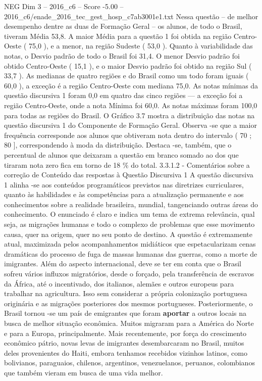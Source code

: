 \begin{textsample}{NEG Dim 3 – 2016\_c6 – Score -5.00 – 2016\_c6/enade\_2016\_tec\_gest\_hosp\_c7ab3001e1.txt}
Nessa questão – de melhor desempenho dentre as duas de Formação Geral – os alunos, de todo o Brasil, tiveram Média 53,8.
A maior Média para a questão 1 foi obtida na região Centro-Oeste ( 75,0 ), e a menor, na região Sudeste ( 53,0 ).
Quanto à variabilidade das notas, o Desvio padrão de todo o Brasil foi 31,4.
O menor Desvio padrão foi obtido Centro-Oeste ( 15,1 ), e o maior Desvio padrão foi obtido na região Sul ( 33,7 ).
As medianas de quatro regiões e do Brasil como um todo foram iguais ( 60,0 ), a exceção é a região Centro-Oeste com mediana 75,0.
As notas mínimas da questão discursiva 1 foram 0,0 em quatro das cinco regiões — a exceção foi a região Centro-Oeste, onde a nota Mínima foi 60,0.
As notas máximas foram 100,0 para todas as regiões do Brasil.
O Gráfico 3.7 mostra a distribuição das notas na questão discursiva 1 do Componente de Formação Geral.
Observa -se que a maior frequência corresponde aos alunos que obtiveram nota dentro do intervalo ( 70 ; 80 ], correspondendo à moda da distribuição.
Destaca -se, também, que o percentual de alunos que deixaram a questão em branco somado ao dos que tiraram nota zero fica em torno de 18 \% do total. 3.3.1.2 - Comentários sobre a correção de Conteúdo das respostas à Questão Discursiva 1 A questão discursiva 1 alinha -se aos conteúdos programáticos previstos nas diretrizes curriculares, quanto às habilidades e às competências para a atualização permanente e aos conhecimentos sobre a realidade brasileira, mundial, tangenciando outras áreas do conhecimento.
O enunciado é claro e indica um tema de extrema relevância, qual seja, as migrações humanas e todo o complexo de problemas que esse movimento causa, quer na origem, quer no seu ponto de destino.
A questão é extremamente atual, maximizada pelos acompanhamentos midiáticos que espetacularizam cenas dramáticas do processo de fuga de massas humanas das guerras, como a morte de imigrantes.
Além do aspecto internacional, deve se ter em conta que o Brasil sofreu vários influxos migratórios, desde o forçado, pela transferência de escravos da África, até o incentivado, dos italianos, alemães e outros europeus para trabalhar na agricultura.
Isso sem considerar a própria colonização portuguesa originária e as migrações posteriores dos mesmos portugueses.
Posteriormente, o Brasil tornou -se um país de emigrantes que foram \textbf{aportar} a outros locais na busca de melhor situação econômica.
Muitos migraram para a América do Norte e para a Europa, principalmente.
Mais recentemente, por força do crescimento econômico pátrio, novas levas de imigrantes desembarcaram no Brasil, muitos deles provenientes do Haiti, embora tenhamos recebidos vizinhos latinos, como bolivianos, paraguaios, chilenos, argentinos, venezuelanos, peruanos, colombianos que também vieram em busca de uma vida melhor.

\end{textsample}
